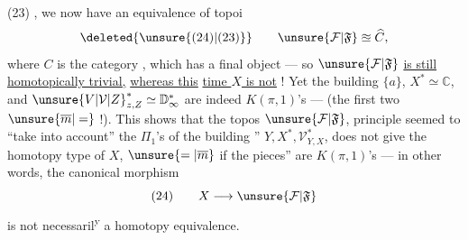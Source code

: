 \noindent (23)
,
we now have an equivalence of topoi
\[
\deleted{\unsure{(24)|(23)}}\qquad \unsure{\mathcal F|\mathfrak F}\approxeq\widehat C,
\]
where $C$ is the category \diagram{\begin{tikzcd}[column sep=small]\bullet\arrow[r]&\bullet\end{tikzcd}}, which has
a final object --- so $\unsure{\mathcal F|\mathfrak F}$ \uline{is still}
\uline{homotopically trivial,} \uline{whereas this}
\uline{time $X$ is not} ! Yet the building
 $\{a\}$, $X^*\simeq\mathbb C$, and
${\unsure{V|\mathcal V|Z}}^*_{z,Z}\simeq\mathbb D^*_{\infty}$ are indeed $K(\pi,1)$'s ---
(the first two $\unsure{\overline m|=}$  !). This
shows that the topos $\unsure{\mathcal F|\mathfrak F}$, 
principle seemed to ``take into account'' the
$\Pi_1$'s of the building '' $Y,X^*,\mathcal V^*_{Y,X}$,
does not give  the homotopy type
of $X$, $\unsure{=|\overline m}$ if the pieces'' are
$K(\pi,1)$'s --- in other words, the
canonical morphism
\[
(24)\qquad X\longrightarrow\unsure{\mathcal F|\mathfrak F}
\]
is not necessaril\textsuperscript{y} a homotopy equivalence.
